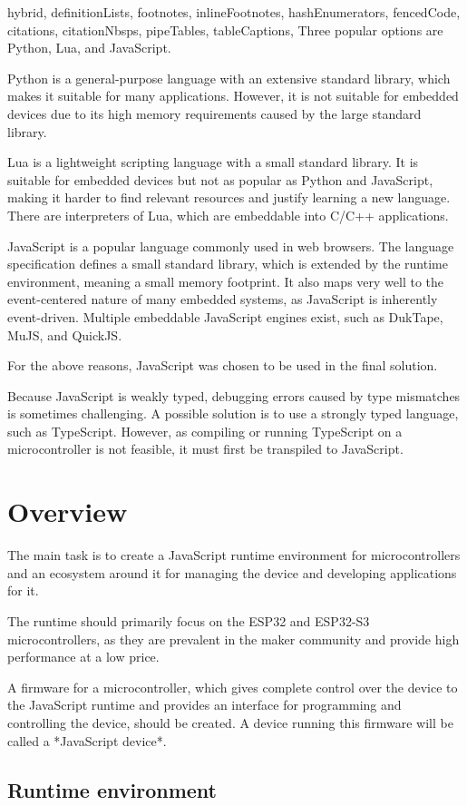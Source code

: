\begin{markdown*}{%
  hybrid,
  definitionLists,
  footnotes,
  inlineFootnotes,
  hashEnumerators,
  fencedCode,
  citations,
  citationNbsps,
  pipeTables,
  tableCaptions,
}
Three popular options are Python, Lua, and JavaScript.

Python is a general-purpose language with an extensive standard library, which makes it suitable for many applications. However, it is not suitable for embedded devices due to its high memory requirements caused by the large standard library.

Lua is a lightweight scripting language with a small standard library. It is suitable for embedded devices but not as popular as Python and JavaScript, making it harder to find relevant resources and justify learning a new language. There are interpreters of Lua, which are embeddable into C/C++ applications.

JavaScript is a popular language commonly used in web browsers. The language specification defines a small standard library, which is extended by the runtime environment, meaning a small memory footprint. It also maps very well to the event-centered nature of many embedded systems, as JavaScript is inherently event-driven. Multiple embeddable JavaScript engines exist, such as DukTape, MuJS, and QuickJS.

For the above reasons, JavaScript was chosen to be used in the final solution.

Because JavaScript is weakly typed, debugging errors caused by type mismatches is sometimes challenging. A possible solution is to use a strongly typed language, such as TypeScript. However, as compiling or running TypeScript on a microcontroller is not feasible, it must first be transpiled to JavaScript.


\chapter{Overview}

The main task is to create a JavaScript runtime environment for microcontrollers and an ecosystem around it for managing the device and developing applications for it.

The runtime should primarily focus on the ESP32 and ESP32-S3 microcontrollers, as they are prevalent in the maker community and provide high performance at a low price.

A firmware for a microcontroller, which gives complete control over the device to the JavaScript runtime and provides an interface for programming and controlling the device, should be created. A device running this firmware will be called a *JavaScript device*.

\section{Runtime environment}


\end{markdown*}
